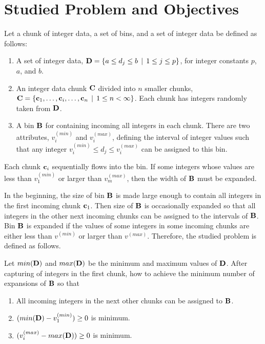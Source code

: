 \documentclass[lettersize,journal]{IEEEtran}
\begin{document}

\section{Studied Problem and Objectives}

Let a chunk of integer data, a set of bins, and a set of integer data be defined as follows: 
\begin{enumerate}
\item A set of integer data, ${\bf D} = \{a \leq d_{j} \leq b \:\: | \:\: 1 \leq j \leq p\}$,
for integer constants $p$, $a$, and $b$.
\item An integer data chunk ${\bf C}$ divided into $n$ smaller chunks, 
${\bf C} = \{{\bf c}_{1}, \ldots, {\bf c}_{i}, \ldots, {\bf c}_{n} \:\: | \:\: 1 \leq n < \infty\}$. 
Each chunk has integers randomly taken from ${\bf D}$.
\item A bin ${\bf B}$ for containing incoming all integers in each chunk. There are two attributes, 
$v^{(min)}_{i}$ and $v^{(max)}_{i}$, defining the interval of integer values such that any integer 
$v^{(min)}_{i} \leq d_{j} \leq v^{(max)}_{i}$ can be assigned to this bin. 
\end{enumerate}
Each chunk ${\bf c}_{i}$ sequentially flows into the bin. If some integers whose values are
less than $v^{(min)}_{1}$ or larger than $v^{(max)}_{m}$, then the width of ${\bf B}$ must be expanded.

In the beginning, the size of bin ${\bf B}$ is made large enough to contain all integers in the first 
incoming chunk ${\bf c}_{1}$. Then size of ${\bf B}$ is occasionally expanded so that all integers in 
the other next incoming chunks can be assigned to the intervals of ${\bf B}$. Bin ${\bf B}$ is expanded 
if the values of some integers in some incoming chunks are either less than $v^{(min)}$ or larger 
than $v^{(max)}$. Therefore, the studied problem is defined as follows. 

Let $min({\bf D})$ and $max({\bf D})$ be the minimum and maximum values of ${\bf D}$. After capturing 
of integers in the first chunk, how to achieve the minimum number of expansions of ${\bf B}$ so that 
\begin{enumerate}
\item All incoming integers in the next other chunks can be assigned to ${\bf B}$.
\item $(min({\bf D}) - v^{(min)}_{1}) \geq 0$ is minimum.
\item $(v^{(max)}_{i} - max({\bf D})) \geq 0$ is minimum.
\end{enumerate}
\end{document}

